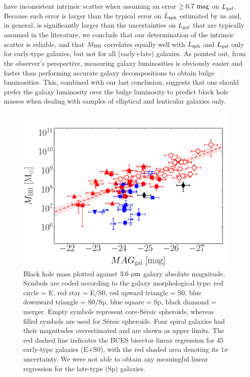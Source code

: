 \documentclass[preprint2]{emulateapj}
\begin{document}
have inconsistent intrinsic scatter when assuming an error $\geq 0.7\rm~mag$ on $L_{\rm gal}$. 
Because such error is larger than the typical error on $L_{\rm sph}$ estimated by us 
and, in general, is significantly larger than the uncertainties on $L_{\rm gal}$ that are typically assumed in the literature, 
we conclude that our determination of the intrinsic scatter is reliable, 
and that $M_{\rm BH}$ correlates equally well with $L_{\rm sph}$ and $L_{\rm gal}$ only for early-type galaxies, but not for all (early+late) galaxies.
As \cite{lasker2014anal} pointed out, from the observer's perspective, measuring galaxy luminosities is obviously easier and faster 
than performing accurate galaxy decompositions to obtain bulge luminosities. 
This, combined with our last conclusion, suggests that one should prefer the galaxy luminosity over the bulge luminosity 
to predict black hole masses when dealing with samples of elliptical and lenticular galaxies only.


\begin{figure}[h]
\begin{center}
\includegraphics[width=\columnwidth]{images/mbh_vs_mag_tot.pdf}
\caption{Black hole mass plotted against $3.6\rm~\mu m$ galaxy absolute magnitude. 
Symbols are coded according to the galaxy morphological type: red circle = E, red star = E/S0, 
red upward triangle = S0, blue downward triangle = S0/Sp, blue square = Sp, black diamond = merger. 
Empty symbols represent core-S\'ersic spheroids, whereas filled symbols are used for S\'ersic spheroids. 
Four spiral galaxies had their magnitudes overestimated and are shown as upper limits. 
The red dashed line indicates the BCES bisector linear regression for 45 early-type galaxies (E+S0), 
with the red shaded area denoting its $1\sigma$ uncertainty. 
We were not able to obtain any meaningful linear regression for the late-type (Sp) galaxies. }
\label{fig:mbhmaggal}
\end{center}
\end{figure}
\end{document}
